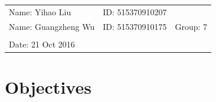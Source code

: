 \documentclass{article}
\begin{document}
\vspace*{0.25cm}

\hrulefill

\thispagestyle{empty}

\begin{center}
\begin{large}
\end{large}

\hrulefill

\vspace*{5cm}
\begin{Large}
\end{Large}

\vspace{2em}

\begin{large}
\end{large}
\end{center}


\vfill

\begin{table}[h!]
\flushleft
\begin{tabular}{lll}
Name: Yihao Liu \hspace*{2em}&
ID: 515370910207\hspace*{2em} \\
Name: Guangzheng Wu \hspace*{2em}&
ID: 515370910175\hspace*{2em}& Group: 7\\


\\

Date: 21 Oct 2016 

\end{tabular}
\end{table}

\hfill
\begin{tiny}
[rev. 1.0]
\end{tiny}

\newpage

\tableofcontents

\newpage

\section{Objectives}
\end{document}
